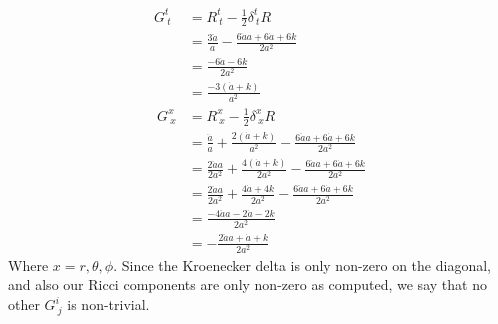 \documentclass{article}
\theoremstyle{definition}
\begin{document}
\begin{align*}
    G^t_{\ t} &= R^t_{\ t} - \frac{1}{2}\delta^t_{\ t} R \\
    &= \frac{3\ddot a}{a} - \frac{6 \ddot a a + 6 \dot a + 6k}{2a^2}\\
    &= \frac{-6 \dot a - 6k}{2a^2}\\
    &= \frac{-3(\dot a + k)}{a^2} \\\
    G^x_{\ x} &= R^x_{\ x} - \frac{1}{2}\delta^x_{\ x} R \\
    &= \frac{\ddot a}{a} + \frac{2(\dot a + k)}{a^2} - \frac{6 \ddot a a + 6 \dot a + 6k}{2a^2}\\
    &= \frac{2 \ddot a a}{2a^2} + \frac{4(\dot a + k)}{2a^2} - \frac{6 \ddot a a + 6 \dot a + 6k}{2a^2} \\
    &= \frac{2 \ddot a a}{2a^2} + \frac{4\dot a + 4k}{2a^2} - \frac{6 \ddot a a + 6 \dot a + 6k}{2a^2}\\
    &= \frac{-4 \ddot a a - 2 \dot a - 2k}{2a^2}\\
    &= - \frac{2 \ddot a a + \dot a + k}{2a^2}
\end{align*}
Where $x = r, \theta, \phi$. Since the Kroenecker delta is only non-zero on the diagonal, and also our Ricci components 
are only non-zero as computed, we say that no other $G^i_{\ j}$ is non-trivial.
\end{document}

